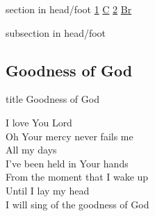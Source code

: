 \documentclass{beamer}
\begin{document}
{
{ 
 {
 \begin{beamercolorbox}[ht=4.5ex,dp=1.5ex,%
      leftskip=.3cm,rightskip=.3cm plus1fil]{section in head/foot}
 \fontsize{12}{25}\selectfont 
\hyperlink{Goodness of God['All my life You have been faithful']1}{1}
\hyperlink{Goodness of God['All my life You have been faithful']C}{C}
\hyperlink{Goodness of God['All my life You have been faithful']2}{2}
\hyperlink{Goodness of God['All my life You have been faithful']Br}{Br}
 
 \end{beamercolorbox}%
  \begin{beamercolorbox}[ht=2.5ex,dp=1.125ex,%
   leftskip=.3cm,rightskip=.3cm plus1fil]{subsection in head/foot}
   \insertauthor
 \end{beamercolorbox}%
 }
}
\subsection{ Goodness of God }

\hypertarget{Goodness of God['All my life You have been faithful']}{}
\begin{frame}{}
 \vfill
  \centering
  \begin{beamercolorbox}[sep=8pt,center,shadow=true,rounded=true]{title}
    Goodness of God    
  \end{beamercolorbox}
  \vfill
\end{frame}

\hypertarget{Goodness of God['All my life You have been faithful']1}{}
\begin{frame}{}
\fontsize{ 20 }{ 27 }\selectfont

I love You Lord\\ 
Oh Your mercy never fails me\\ 
All my days\\ 
I've been held in Your hands\\ 
From the moment that I wake up\\ 
Until I lay my head\\ 
I will sing of the goodness of God 

\end{frame}

\hypertarget{Goodness of God['All my life You have been faithful']C}{}
\begin{frame}{}
\fontsize{ 20 }{ 27 }\selectfont


\end{frame}}
\end{document}
